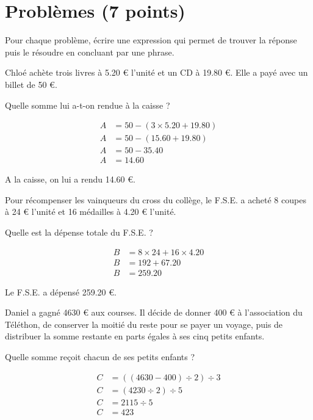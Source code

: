\section{Problèmes (7 points)}

Pour chaque problème, écrire une expression qui permet de trouver la réponse puis le résoudre en concluant par une phrase.

\begin{questions}
	\question[1] Chloé achète trois livres à \num{5.20} € l'unité et un CD à \num{19.80} €. Elle a payé avec un billet de 50 €. 
	
	Quelle somme lui a-t-on rendue à la caisse ?
	
	\begin{solution}
		\begin{align*}
			A &= 50 - (3 \times \num{5.20} + \num{19.80}) \\
			A &= 50 - (\num{15.60} + \num{19.80}) \\
			A &= 50 - \num{35.40} \\
			A &= \num{14.60}
		\end{align*}
	
		A la caisse, on lui a rendu \num{14.60} €.
	\end{solution}
	
	\question[1\half] Pour récompenser les vainqueurs du cross du collège, le F.S.E. a acheté 8 coupes à 24 € l'unité et 16 médailles à \num{4.20} € l'unité.
	
	Quelle est la dépense totale du F.S.E. ?
	
	\begin{solution}
		\begin{align*}
			B &= 8 \times 24 + 16 \times \num{4.20} \\
			B &= 192 + \num{67.20} \\
			B &= \num{259.20}
		\end{align*}
		
		Le F.S.E. a dépensé \num{259.20} €.
	\end{solution}
	\question[1\half] Daniel a gagné \num{4630} € aux courses. Il décide de donner 400 € à l'association du Téléthon, de conserver la moitié du reste pour se payer un voyage, puis de distribuer la somme restante en parts égales à ses cinq petits enfants.
	
	Quelle somme reçoit chacun de ses petits enfants ?
	
	\begin{solution}
		\begin{align*}
			C &= ((4630 - 400) \div 2) \div 3 \\
			C &= (4230 \div 2) \div 5 \\
			C &= 2115 \div 5 \\
			C &= 423 
		\end{align*}
		

\end{solution}
\end{questions}
